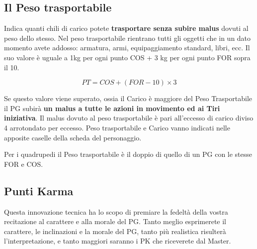 
\subsection{Il Peso trasportabile}

Indica quanti chili di carico potete \textbf{trasportare senza subire malus}
dovuti al peso dello stesso.  Nel peso trasportabile rientrano tutti
gli oggetti che in un dato momento avete addosso: armatura, armi,
equipaggiamento standard, libri, ecc. Il suo valore \`e uguale a
1kg per ogni punto COS + 3 kg per ogni punto FOR sopra il 10.

$$PT = COS + (FOR - 10) \times 3$$



Se questo valore viene superato, ossia il Carico \`e maggiore del
Peso Trasportabile il PG subir\`a \textbf{un malus a tutte le azioni in
movimento ed ai Tiri iniziativa}.  Il malus dovuto al peso
trasportabile \`e pari all'eccesso di carico diviso 4 arrotondato
per eccesso.  Peso trasportabile e Carico vanno indicati nelle
apposite caselle della scheda del personaggio.

Per i quadrupedi il Peso trasportabile \`e il doppio di quello di un
PG con le stesse FOR e COS.



\subsection{Punti Karma}

Questa innovazione tecnica ha lo scopo di premiare la fedelt\`a
della vostra recitazione al carattere e alla morale del PG.  Tanto
meglio esprimerete il carattere, le inclinazioni e la morale del PG,
tanto pi\`u realistica risulter\`a l'interpretazione, e tanto maggiori
saranno i PK che riceverete dal Master.

